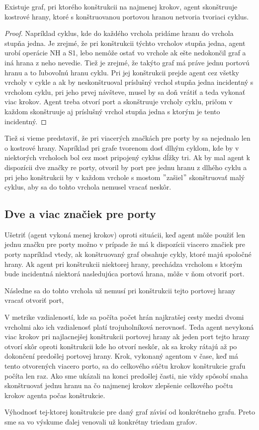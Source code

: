 \begin{lem}
Existuje graf, pri ktorého konštrukcii na najmenej krokov, agent
skonštruuje kostrové hrany, ktoré s konštruovanou portovou hranou netvoria
tvoriaci cyklus.
\end{lem}
\begin{proof}
Napríklad cyklus, kde do každého vrchola pridáme hranu do vrchola stupňa
jedna. Je zrejmé, že pri konštrukcii týchto vrcholov stupňa jedna, agent
urobí operácie NH a S1, lebo nemôže ostať vo vrchole ak ešte nedokončil graf
a iná hrana z neho nevedie. Tiež je zrejmé, že takýto graf má práve jednu
portovú hranu a to ľubovoľnú hranu cyklu. Pri jej konštrukcii prejde agent
cez všetky vrcholy v cykle a ak by neskonštruoval príslušný vrchol stupňa
jedna incidentný s vrcholom cyklu, pri jeho prvej návšteve, musel by sa doň
vrátiť a teda vykonať viac krokov. Agent treba otvorí port a skonštruuje
vrcholy cyklu, pričom v každom skonštruuje aj príslušný vrchol stupňa jedna s
ktorým je tento incidentný.
\end{proof}

Tiež si vieme predstaviť, že pri viacerých značkách pre porty
 by sa nejednalo len o kostrové hrany. Napríklad
pri grafe tvorenom dosť dlhým cyklom, kde by v niektorých vrcholoch bol cez
most pripojený cyklus dĺžky tri. Ak by mal agent k dispozícii dve značky re
porty, otvoril by port pre jednu hranu z dlhého cyklu a pri jeho konštrukcii
by v každom vrchole s mostom $"$zašiel$"$ skonštruovať malý cyklus, aby sa
do tohto vrchola nemusel vracať neskôr.

\subsection{Dve a viac značiek pre porty}
Ušetriť (agent vykoná menej krokov) oproti situácii, 
keď agent môže použiť len jednu značku pre porty
možno v prípade že má k dispozícii viacero značiek pre porty napríklad vtedy,
 ak konštruovaný graf obsahuje cykly, ktoré majú spoločné hrany.
Ak agent pri konštrukcii niektorej hrany, 
prechádza vrcholom s ktorým bude incidentná niektorá nasledujúca
portová
hrana, môže v ňom otvoriť port. 

Následne sa do tohto vrchola už nemusí pri konštrukcii
tejto portovej hrany vracať otvoriť port, 

V metrike
vzdialeností, kde sa počíta počet hrán najkratšej cesty medzi dvomi vrcholmi
ako ich vzdialenosť platí trojuholníková nerovnosť. Teda agent
nevykoná viac krokov pri najlacnejšej 
konštrukcii portovej hrany ak jeden port tejto hrany otvorí skôr oproti
konštrukcii kde ho otvorí neskôr, ak sa kroky rátajú až po dokončení
predošlej portovej hrany. Krok, vykonaný agentom v čase, keď má tento
otvorených viacero porto, sa do celkového súčtu krokov konštrukcie grafu 
počíta len raz.
Ako sme ukázali na konci predošlej časti, nie vždy spôsobí snaha skonštruovať 
jednu hranu na čo
najmenej krokov zlepšenie celkového počtu krokov agenta počas konštrukcie.

Výhodnosť tej-ktorej konštrukcie pre daný graf závisí od konkrétneho grafu.
Preto sme sa vo výskume ďalej venovali už konkrétny triedam grafov.